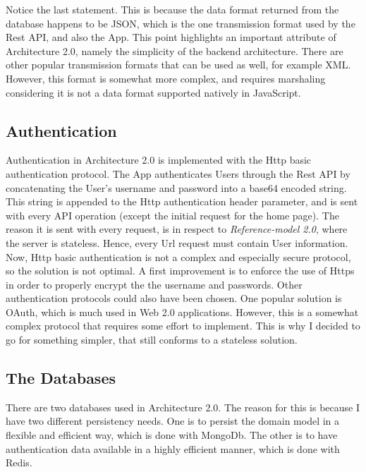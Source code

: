 Notice the last statement. This is because the data format returned from the database happens to be JSON, which is the one transmission format used by the Rest API, and also the App. This point highlights an important attribute of Architecture 2.0, namely the simplicity of the backend architecture. There are other popular transmission formats that can be used as well, for example XML. However, this format is somewhat more complex, and requires marshaling considering it is not a data format supported natively in JavaScript. 

\subsection{Authentication}
Authentication in Architecture 2.0 is implemented with the Http basic authentication protocol. The App authenticates Users through the Rest API by concatenating the User's username and password into a base64 encoded string. This string is appended to the Http authentication header parameter, and is sent with every API operation (except the initial request for the home page). The reason it is sent with every request, is in respect to \textit{Reference-model 2.0}, where the server is stateless. Hence, every Url request must contain User information. Now, Http basic authentication is not a complex and especially secure protocol, so the solution is not optimal. A first improvement is to enforce the use of Https in order to properly encrypt the the username and passwords. Other authentication protocols could also have been chosen. One popular solution is OAuth, which is much used in Web 2.0 applications. However, this is a somewhat complex protocol that requires some effort to implement. This is why I decided to go for something simpler, that still conforms to a stateless solution. 

\subsection{The Databases}
There are two databases used in Architecture 2.0. The reason for this is because I have two different persistency needs. One is to persist the domain model in a flexible and efficient way, which is done with MongoDb. The other is to have authentication data available in a highly efficient manner, which is done with Redis.

